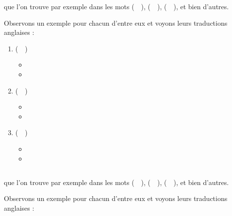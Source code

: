 que l'on trouve par exemple dans les mots
 (~~),  (~~),  (~~), et bien d'autres.

Observons un exemple pour chacun d'entre eux et voyons leurs
traductions anglaises :\par

\begin{enumerate}
\item {} (~~)
  \begin{itemize}
  \item {}
    \item {}
    \end{itemize}
    
\item {} (~~)
  \begin{itemize}
  \item {}
  \item {}
  \end{itemize}

  
\item {} (~~)
  \begin{itemize}
  \item {}
  \item {}
  \end{itemize}
   
\end{enumerate}

\subsection{}\label{subsec:ifr}

que l'on trouve par exemple dans les mots
 (~~),  (~~),  (~~), et bien d'autres.

Observons un exemple pour chacun d'entre eux et voyons leurs
traductions anglaises :\par


